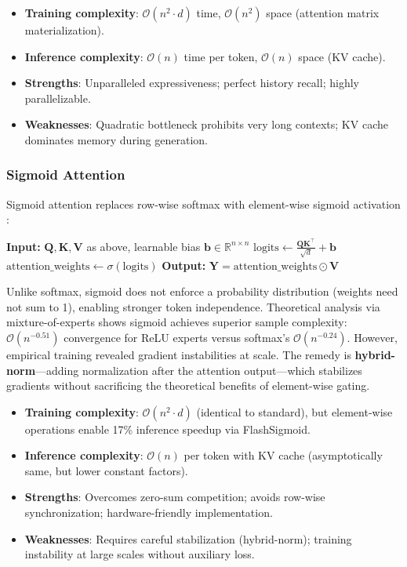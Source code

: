 \begin{itemize}[leftmargin=*]
    \item \textbf{Training complexity}: $\mathcal{O}(n^2 \cdot d)$ time, $\mathcal{O}(n^2)$ space (attention matrix materialization).
    \item \textbf{Inference complexity}: $\mathcal{O}(n)$ time per token, $\mathcal{O}(n)$ space (KV cache).
    \item \textbf{Strengths}: Unparalleled expressiveness; perfect history recall; highly parallelizable.
    \item \textbf{Weaknesses}: Quadratic bottleneck prohibits very long contexts; KV cache dominates memory during generation.
\end{itemize}

\subsubsection{Sigmoid Attention}
Sigmoid attention replaces row-wise softmax with element-wise sigmoid activation \citep{ramapuram_theory_2024}:

\begin{algorithmic}[1]
\State \textbf{Input:} $\mathbf{Q}, \mathbf{K}, \mathbf{V}$ as above, learnable bias $\mathbf{b} \in \mathbb{R}^{n \times n}$
\State $\text{logits} \gets \frac{\mathbf{Q}\mathbf{K}^\top}{\sqrt{d}} + \mathbf{b}$
\State $\text{attention\_weights} \gets \sigma(\text{logits})$ 
\State \textbf{Output:} $\mathbf{Y} = \text{attention\_weights} \odot \mathbf{V}$
\end{algorithmic}

Unlike softmax, sigmoid does not enforce a probability distribution (weights need not sum to 1), enabling stronger token independence. Theoretical analysis via mixture-of-experts shows sigmoid achieves superior sample complexity: $\mathcal{O}(n^{-0.51})$ convergence for ReLU experts versus softmax's $\mathcal{O}(n^{-0.24})$. However, empirical training revealed gradient instabilities at scale. The remedy is \textbf{hybrid-norm}---adding normalization after the attention output---which stabilizes gradients without sacrificing the theoretical benefits of element-wise gating.

\begin{itemize}[leftmargin=*]
    \item \textbf{Training complexity}: $\mathcal{O}(n^2 \cdot d)$ (identical to standard), but element-wise operations enable 17\% inference speedup via FlashSigmoid.
    \item \textbf{Inference complexity}: $\mathcal{O}(n)$ per token with KV cache (asymptotically same, but lower constant factors).
    \item \textbf{Strengths}: Overcomes zero-sum competition; avoids row-wise synchronization; hardware-friendly implementation.
    \item \textbf{Weaknesses}: Requires careful stabilization (hybrid-norm); training instability at large scales without auxiliary loss.
\end{itemize}


